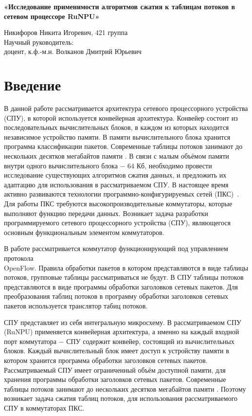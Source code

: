 \documentclass[a4peper, 12pt, titlepage, finall]{extreport}
\begin{document}
\begin{center}
    {\large \bf «Исследование применимости алгоритмов сжатия к таблицам потоков в сетевом процессоре RuNPU»}
\end{center}
        \begin{flushright}
            {Никифоров Никита Игоревич, 421 группа}\\
            {Научный руководитель:\\доцент, к.ф.-м.н. Волканов Дмитрий Юрьевич}
        \end{flushright}
    \section{Введение}
        В данной работе рассматривается архитектура сетевого процессорного устройства (СПУ), в которой используется конвейерная архитектура.
        Конвейер состоит из последовательных вычислительных блоков, в каждом из которых находится независимое устройство памяти.
        В памяти вычислительного блока хранится программа классификации пакетов. Современные таблицы потоков занимают
        до нескольких десятков мегабайтов памяти \cite{rottenstreich2016optimal}.
        В связи с малым объёмом памяти внутри одного вычислительного блока $-$ 64 Кб, 
        необходимо провести исследование существующих алгоритмов сжатия данных, и предложить их адаптацию для использования 
        в рассматриваемом СПУ.
        \fi
        В настоящее время активно развиваются технологии программно-конфигурируемых сетей (ПКС)~\cite{smelopen}. Для работы ПКС требуются высокопроизводительные коммутаторы, 
        которые выполняют функцию передачи данных. Возникает задача разработки программируемого сетевого процессорного устройства (СПУ),
        являющегося основным функциональным элементом коммутаторов.

        В работе рассматривается коммутатор функционирующий под управлением протокола\\ OpenFlow.
        Правила обработки пакетов в котором представляются в виде таблицы потоков, групповые таблицы рассматриваться не будут.
        В СПУ таблицы потоков представляются в виде программы обработки заголовков сетевых пакетов.
        Для преобразования таблиц потоков в программу обработки заголовков сетевых пакетов используется транслятор табиц потоков.

        СПУ представляет из себя интегральную микросхему. В рассматриваемом СПУ (RuNPU) применяется конвейерная архитектура,
        а именно на каждый входной порт коммутатора $-$ СПУ содержит конвейер, состоящий из вычислительных блоков. Каждый вычислительный блок имеет доступ к 
        устройству памяти в котором хранится программа обработки заголовков сетевых пакетов. Рассматриваемый СПУ имеет ограниченный объём доступной
        памяти, для хранения программы обработки заголовков сетевых пакетов.
        Современные таблицы потоков занимают до нескольких десятков мегабайтов памяти \cite{rottenstreich2016optimal}. Поэтому возникает задача сжатия таблиц потоков,
        для использования рассматриваемого СПУ в коммутаторах ПКС.
\end{document}
